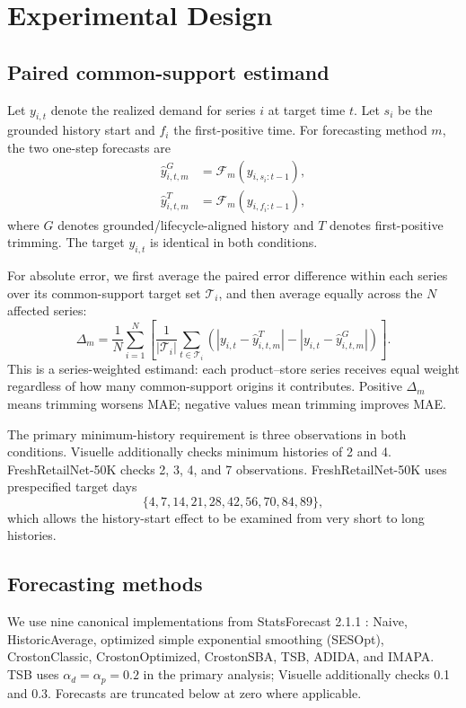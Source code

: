 \section{Experimental Design}

\subsection{Paired common-support estimand}

Let $y_{i,t}$ denote the realized demand for series $i$ at target time $t$. Let $s_i$ be the grounded history start and $f_i$ the first-positive time. For forecasting method $m$, the two one-step forecasts are
\begin{align}
\hat y^{G}_{i,t,m} &= \mathcal{F}_m(y_{i,s_i:t-1}),\\
\hat y^{T}_{i,t,m} &= \mathcal{F}_m(y_{i,f_i:t-1}),
\end{align}
where $G$ denotes grounded/lifecycle-aligned history and $T$ denotes first-positive trimming. The target $y_{i,t}$ is identical in both conditions.

For absolute error, we first average the paired error difference within each series over its common-support target set $\mathcal{T}_i$, and then average equally across the $N$ affected series:
\begin{equation}
\Delta_m =
\frac{1}{N}
\sum_{i=1}^{N}
\left[
\frac{1}{|\mathcal{T}_i|}
\sum_{t\in\mathcal{T}_i}
\left(
|y_{i,t}-\hat y^T_{i,t,m}|
-
|y_{i,t}-\hat y^G_{i,t,m}|
\right)
\right].
\end{equation}
This is a series-weighted estimand: each product--store series receives equal weight regardless of how many common-support origins it contributes. Positive $\Delta_m$ means trimming worsens MAE; negative values mean trimming improves MAE.

The primary minimum-history requirement is three observations in both conditions. Visuelle additionally checks minimum histories of 2 and 4. FreshRetailNet-50K checks 2, 3, 4, and 7 observations. FreshRetailNet-50K uses prespecified target days
\[
\{4,7,14,21,28,42,56,70,84,89\},
\]
which allows the history-start effect to be examined from very short to long histories.

\subsection{Forecasting methods}

We use nine canonical implementations from StatsForecast 2.1.1 \citep{garza2022statsforecast}:
Naive, HistoricAverage, optimized simple exponential smoothing (SESOpt), CrostonClassic, CrostonOptimized, CrostonSBA, TSB, ADIDA, and IMAPA. TSB uses $\alpha_d=\alpha_p=0.2$ in the primary analysis; Visuelle additionally checks 0.1 and 0.3. Forecasts are truncated below at zero where applicable.

